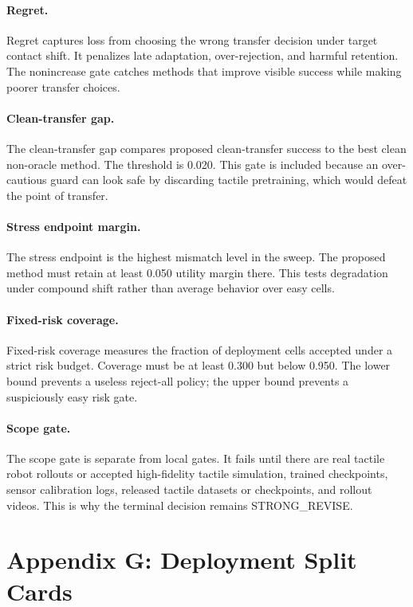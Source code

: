 \documentclass{article}
\begin{document}
\paragraph{Regret.}
Regret captures loss from choosing the wrong transfer decision under target contact shift. It penalizes late adaptation, over-rejection, and harmful retention. The nonincrease gate catches methods that improve visible success while making poorer transfer choices.

\paragraph{Clean-transfer gap.}
The clean-transfer gap compares proposed clean-transfer success to the best clean non-oracle method. The threshold is 0.020. This gate is included because an over-cautious guard can look safe by discarding tactile pretraining, which would defeat the point of transfer.

\paragraph{Stress endpoint margin.}
The stress endpoint is the highest mismatch level in the sweep. The proposed method must retain at least 0.050 utility margin there. This tests degradation under compound shift rather than average behavior over easy cells.

\paragraph{Fixed-risk coverage.}
Fixed-risk coverage measures the fraction of deployment cells accepted under a strict risk budget. Coverage must be at least 0.300 but below 0.950. The lower bound prevents a useless reject-all policy; the upper bound prevents a suspiciously easy risk gate.

\paragraph{Scope gate.}
The scope gate is separate from local gates. It fails until there are real tactile robot rollouts or accepted high-fidelity tactile simulation, trained checkpoints, sensor calibration logs, released tactile datasets or checkpoints, and rollout videos. This is why the terminal decision remains STRONG\_REVISE.

\clearpage
\section{Appendix G: Deployment Split Cards}
\end{document}
